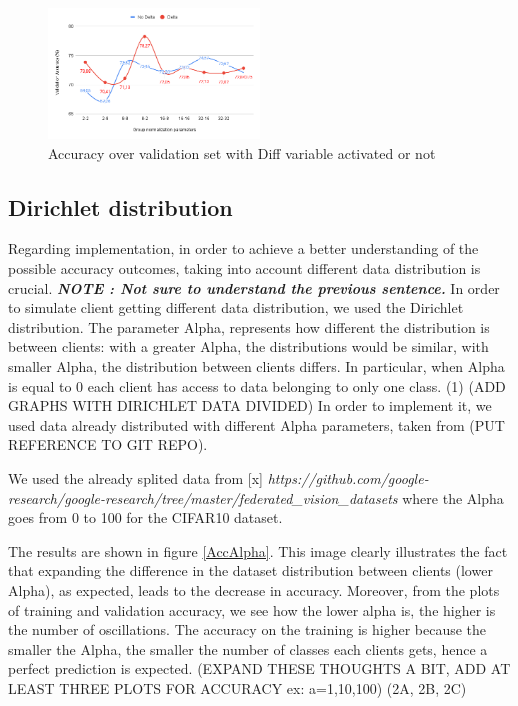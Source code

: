 \documentclass[twocolumn]{article}
\begin{document}
\begin{figure}
    \centering
    \includegraphics[width=0.5\textwidth,height=.3\textheight]{groupnormalizationDeltaNoDelta.png}
    \caption{Accuracy over validation set with Diff variable activated or not}
     \label{AccDiff} 
\end{figure}

\subsection{Dirichlet distribution}

Regarding implementation, in order to achieve a better understanding of the possible accuracy outcomes, taking into account different data distribution is crucial. \textbf{\emph{NOTE : Not sure to understand the previous sentence.}} In order to simulate client getting different data distribution, we used the Dirichlet distribution. The parameter Alpha, represents how different the distribution is between clients: with a greater Alpha, the distributions 
would be similar, with smaller Alpha, the distribution between clients differs.
In particular, when Alpha is equal to 0 each client has access to data belonging to only one class.
(1)
(ADD GRAPHS WITH DIRICHLET DATA DIVIDED)
In order to implement it, we used data already distributed with different Alpha parameters, taken from (PUT REFERENCE TO GIT REPO).


We used the already splited data from [x] \emph{https://github.com/google-research/google-research/tree/master/federated_vision_datasets} where the Alpha goes from 0 to 100 for the CIFAR10 dataset.


The results are shown in figure \ref{AccAlpha}. This image clearly illustrates the fact that expanding the difference in the dataset distribution between clients (lower Alpha), as expected, leads to the decrease in accuracy. 
Moreover, from the plots of training and validation accuracy, we see how the lower alpha is, the higher is the number of oscillations.
The accuracy on the training is higher because the smaller the Alpha, the smaller the number of classes each clients gets, hence a perfect prediction is expected. 
(EXPAND THESE THOUGHTS A BIT, ADD AT LEAST THREE PLOTS FOR ACCURACY ex: a=1,10,100)
(2A, 2B, 2C)
\end{document}
